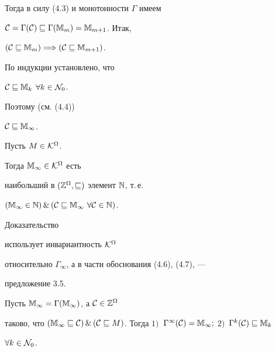 \begin{pf}
Тогда в силу (4.3) и монотонности $\Gamma$ имеем


${\cal C} = {{\Gamma}({\cal C})} \sqsubseteq {{\Gamma}({\Bbb M}_m)} =


{{\Bbb M}_{m+1}}$. Итак,


$({\cal C} \sqsubseteq {{\Bbb M}_m}) \Longrightarrow ({\cal C}


\sqsubseteq {{\Bbb M}_{m+1}})$.


По индукции установлено, что 


${\cal C} \sqsubseteq {{\Bbb M}_k}$ $\forall{k} \in {{\cal N}_0}$.


Поэтому (см. (4.4))


${\cal C} \sqsubseteq {{\Bbb M}_\infty}$.


\end{pf}





\begin{thms}


Пусть $M \in {{\cal K}^{\Omega}}$.


Тогда ${{\Bbb M}_\infty} \in {{\cal K}^\Omega}$ есть


наибольший в $({{\Bbb Z}^\Omega},\sqsubseteq)$ элемент ${\Bbb N}$, т.\,е.


$({{\Bbb M}_\infty} \in {\Bbb N})\, \&\,


({\cal C} \sqsubseteq {{\Bbb M}_\infty}\ \forall{\cal C} \in {\Bbb N})$.


\end{thms}





Доказательство


использует инвариантность ${\cal K}^\Omega$


относительно ${\Gamma}_\infty$, а в части обоснования (4.6), (4.7), ---


предложение 3.5.





\begin{props}


Пусть ${{\Bbb M}_\infty} =


{{\Gamma}({\Bbb M}_\infty)}$, а ${\cal C} \in {{\Bbb Z}^\Omega}$


таково, что $({{\Bbb M}_\infty} \sqsubseteq {\cal C})\, \&\,


({\cal C} \sqsubseteq M)$. Тогда $1)$~${{\Gamma}^\infty}({\cal C}) =


{{\Bbb M}_\infty};$ $2)$~${{\Gamma}^k}({\cal C}) \sqsubseteq {{\Bbb M}_k}$


$\forall{k} \in {{\cal N}_0}$.


\end{props}





